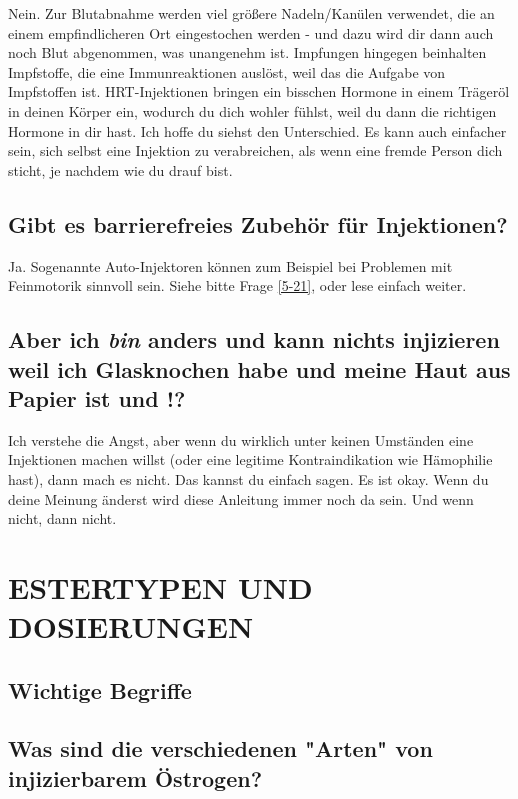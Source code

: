 \documentclass{article}
\begin{document}
Nein. Zur Blutabnahme werden viel größere Nadeln/Kanülen verwendet, die an einem empfindlicheren Ort eingestochen werden - und dazu wird dir dann auch noch Blut abgenommen, was unangenehm ist. Impfungen hingegen beinhalten Impfstoffe, die eine Immunreaktionen auslöst, weil das die Aufgabe von Impfstoffen ist. HRT-Injektionen bringen ein bisschen Hormone in einem Trägeröl in deinen Körper ein, wodurch du dich wohler fühlst, weil du dann die richtigen Hormone in dir hast. Ich hoffe du siehst den Unterschied. Es kann auch einfacher sein, sich selbst eine Injektion zu verabreichen, als wenn eine fremde Person dich sticht, je nachdem wie du drauf bist.

\subsection{Gibt es barrierefreies Zubehör für Injektionen?}

Ja. Sogenannte Auto-Injektoren können zum Beispiel bei Problemen mit Feinmotorik sinnvoll sein. Siehe bitte Frage \ref{5-21}, oder lese einfach weiter.

\subsection{Aber ich \textit{bin} anders und kann nichts injizieren weil ich Glasknochen habe und meine Haut aus Papier ist und \textemdash{}!?}

Ich verstehe die Angst, aber wenn du wirklich unter keinen Umständen eine Injektionen machen willst (oder eine legitime Kontraindikation wie Hämophilie hast), dann mach es nicht. Das kannst du einfach sagen. Es ist okay. Wenn du deine Meinung änderst wird diese Anleitung immer noch da sein. Und wenn nicht, dann nicht. 

 

\section{ESTERTYPEN UND DOSIERUNGEN}\label{td}

\subsection*{Wichtige Begriffe}

\subsection{Was sind die verschiedenen "Arten" von injizierbarem Östrogen?}
\end{document}
